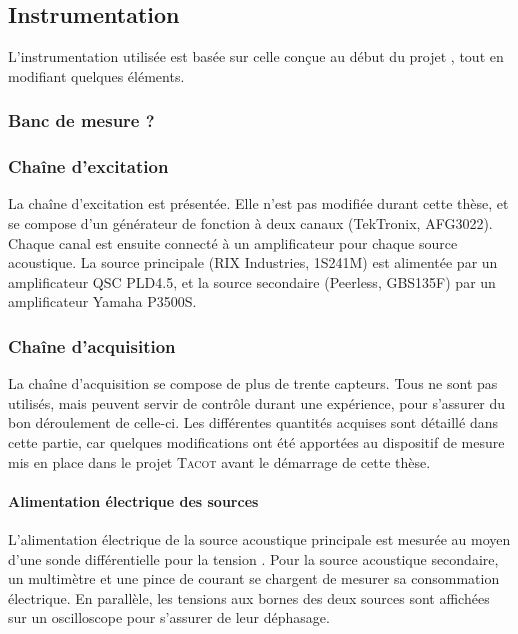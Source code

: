 \subsection{Instrumentation}
L'instrumentation utilisée est basée sur celle conçue au début du projet \cite{ramadan_design_2021}, tout en modifiant quelques éléments.


\subsubsection{Banc de mesure ?}

\subsubsection{Chaîne d'excitation}
La chaîne d'excitation est présentée. Elle n'est pas modifiée durant cette thèse, et se compose d'un générateur de fonction à deux canaux (TekTronix, AFG3022). Chaque canal est ensuite connecté à un amplificateur pour chaque source acoustique. La source principale (RIX Industries, 1S241M) est alimentée par un amplificateur QSC PLD4.5, et la source secondaire (Peerless, GBS135F) par un amplificateur Yamaha P3500S.\medskip


\subsubsection{Chaîne d'acquisition}
La chaîne d'acquisition se compose de plus de trente capteurs. Tous ne sont pas utilisés, mais peuvent servir de contrôle durant une expérience, pour s'assurer du bon déroulement de celle-ci. Les différentes quantités acquises sont détaillé dans cette partie, car quelques modifications ont été apportées au dispositif de mesure mis en place dans le projet \textsc{Tacot} avant le démarrage de cette thèse.

\paragraph{Alimentation électrique des sources} L'alimentation électrique de la source acoustique principale est mesurée au moyen d'une sonde différentielle pour la tension . Pour la source acoustique secondaire, un multimètre  et une pince de courant  se chargent de mesurer sa consommation électrique. En parallèle, les tensions aux bornes des deux sources sont affichées sur un oscilloscope pour s'assurer de leur déphasage.

